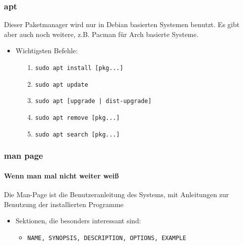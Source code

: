 \documentclass[12pt,utf8]{beamer}
\begin{document}
\begin{frame}
	\frametitle{apt}
	Dieser Paketmanager wird nur in Debian basierten Systemen benutzt. Es gibt aber auch noch weitere, z.B. Pacman für Arch basierte Systeme.
	\begin{itemize}
		\item Wichtigsten Befehle:
		\begin{itemize}
			\item[1.] \texttt{sudo apt install [pkg...]}
			\item[2.] \texttt{sudo apt update}
			\item[3.] \texttt{sudo apt [upgrade | dist-upgrade]}
			\item[4.] \texttt{sudo apt remove [pkg...]}
			\item[5.] \texttt{sudo apt search [pkg...]}
		\end{itemize}
	\end{itemize}
\end{frame}

\begin{frame}
	\frametitle{man page}
	\framesubtitle{Wenn man mal nicht weiter weiß}
	Die Man-Page ist die Benutzeranleitung des Systems, mit Anleitungen zur Benutzung der installierten Programme
	\begin{itemize}
		\item Sektionen, die besonders interessant sind:
		\begin{itemize}
			\item {\scriptsize \texttt{NAME, SYNOPSIS, DESCRIPTION, OPTIONS, EXAMPLE}}
		\end{itemize}
	\end{itemize}
\end{frame}

\end{document}
